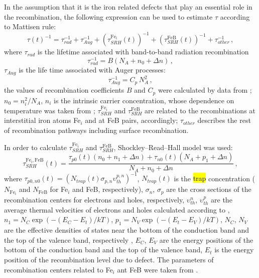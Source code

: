 \documentclass[sn-mathphys]{sn-jnl}%
\theoremstyle{thmstyleone}%
\theoremstyle{thmstyletwo}%
\theoremstyle{thmstylethree}%
\begin{document}
In the assumption that it is the iron related defects that play an essential role in the recombination,
the following expression can be used to estimate $\tau$ according to Mattisen rule:
\begin{equation}
\label{eqTau}
\tau(t)^{-1}=\tau_{rad}^{-1}+\tau_{Aug}^{-1}+(\tau_{SRH}^{\mathrm{Fe_i}}(t))^{-1}
+(\tau_{SRH}^\mathrm{FeB}(t))^{-1}+\tau_{other}^{-1}\,,
\end{equation}
where
$\tau_{rad}$ is the lifetime associated with band-to-band radiation recombination
\begin{equation}
\label{eqTauRad}
\tau_{rad}^{-1}=B(N_A+n_0+\Delta n)\,,
\end{equation}
$\tau_{Aug}$ is the life time associated with Auger processes:
\begin{equation}
\label{eqTauAug}
\tau_{Aug}^{-1}=C_p\,N_A^2\,,
\end{equation}
the values of recombination coefficients $B$ and $C_p$ were calculated by data from \cite{Si_BtB,Si_Auger};
$n_0=n_i^2/N_A$,
$n_i$ is the intrinsic carrier concentration, whose dependence on temperature was taken from \cite{Si_ni_Couderc};
$\tau_{SRH}^{\mathrm{Fe_i}}$  and $\tau_{SRH}^\mathrm{FeB}$ are related to the recombinations at interstitial iron atoms Fe$_i$ and at FeB pairs, accordingly;
$\tau_{other}$ describes the rest of recombination pathways including surface recombination.

In order to calculate $\tau_{SRH}^{\mathrm{Fe_i}}$  and $\tau_{SRH}^\mathrm{FeB}$,
Shockley--Read--Hall model was used:
\begin{equation}
\label{eqTauSRH}
\tau_{SRH}^{\mathrm{Fe_i,FeB}}(t)=\frac{\tau_{p0}(t)(n_0+n_1+\Delta n)+\tau_{n0}(t)(N_A+p_1+\Delta n)}
                             {N_A+n_0+\Delta n}\,,
\end{equation}
where
$\tau_{p0,n0}(t)=(N_{trap}(t) \sigma_{p,n}\upsilon_{th}^{p,n})^{-1}$,
$N_{trap}(t)$ is the \hl{trap} concentration
($N_\mathrm{Fe_i}$ and $N_\mathrm{FeB}$ for Fe$_i$ and FeB, respectively),
$\sigma_n$, $\sigma_p$  are the cross sections of the recombination centers for electrons and holes, respectively,
$\upsilon_{th}^{n}$, $\upsilon_{th}^{p}$ are the average thermal velocities of electrons and holes calculated according to \cite{Nc:Green},
$n_1=N_C \exp(-(E_C-E_t)/kT)$,
$p_1=N_V \exp(-(E_t-E_V)/kT)$,
$N_C$, $N_V$ are the effective densities of states near the bottom of the conduction band
and the top of the valence band, respectively \cite{Si_ni_Couderc},
$E_C$, $E_V$ are the energy positions of the bottom of the conduction band and
the top of the valence band,
$E_t$ is the energy position of the recombination level due to defect.
The parameters of recombination centers related to Fe$_i$ ant FeB were taken from \cite{ROUGIEUX2018}.
\end{document}
